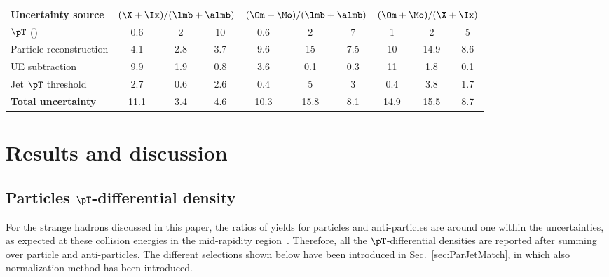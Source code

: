 \documentclass[ALICE,manyauthors]{cernphprep}
\begin{document}
\begin{table}[!ht]
\begin{center}
\begin{tabularx}{\textwidth}{@{} lCCCCCCCCC @{}}
		    \bottomrule
	        \end{tabularx}
	        \begin{tabularx}{\textwidth}{@{} lCCCCCCCCC @{}}
		    \toprule
		    \textbf{Uncertainty source} & 
		    & 
		    &  \\
		    \cmidrule(lr){2-4} \cmidrule(lr){5-7} \cmidrule(lr){8-10}
		    $\pT$ (\GeVc) & 0.6 & 2 &10  & 0.6 & 2 & 7 & 1 & 2 & 5 \\
		    \midrule
		    Particle reconstruction& 4.1& 2.8& 3.7& 9.6& 15& 7.5& 10& 14.9& 8.6\\
		    UE subtraction& 9.9& 1.9& 0.8& 3.6& 0.1& 0.3& 11& 1.8& 0.1\\
		    Jet $\pT$ threshold& 2.7& 0.6& 2.6& 0.4& 5& 3& 0.4& 3.8& 1.7\\
		    \midrule
		    \textbf{Total uncertainty}& 11.1& 3.4& 4.6& 10.3& 15.8& 8.1& 14.9& 15.5& 8.7\\
		    \bottomrule
	\end{tabularx}
	\end{center}
\end{table}

\clearpage

\section{Results and discussion}%
\label{sec:Results}

\subsection{Particles $\pT$-differential density}
\label{subsec:ParPtDensity}

For the strange hadrons discussed in this paper, the ratios of yields for particles and anti-particles are around one within the uncertainties, as expected at these collision energies in the mid-rapidity region~\cite{Acharya:2020uxl, ALICE:2015mpp}.
Therefore, all the $\pT$-differential densities are reported after summing over particle and anti-particles.
The different selections shown below have been introduced in Sec.~\ref{sec:ParJetMatch}, in which also normalization method has been introduced.
\end{document}
